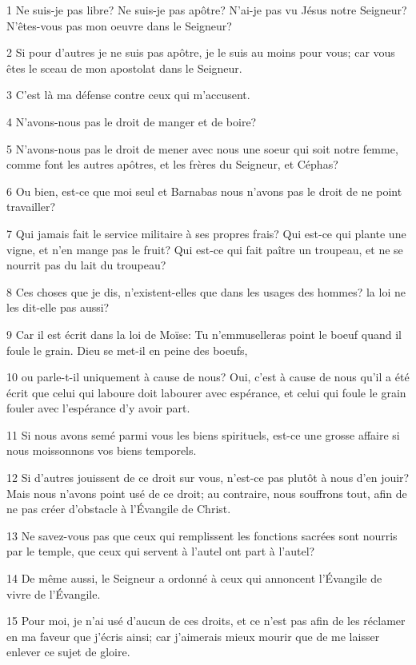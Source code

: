 \par 1 Ne suis-je pas libre? Ne suis-je pas apôtre? N'ai-je pas vu Jésus notre Seigneur? N'êtes-vous pas mon oeuvre dans le Seigneur?
\par 2 Si pour d'autres je ne suis pas apôtre, je le suis au moins pour vous; car vous êtes le sceau de mon apostolat dans le Seigneur.
\par 3 C'est là ma défense contre ceux qui m'accusent.
\par 4 N'avons-nous pas le droit de manger et de boire?
\par 5 N'avons-nous pas le droit de mener avec nous une soeur qui soit notre femme, comme font les autres apôtres, et les frères du Seigneur, et Céphas?
\par 6 Ou bien, est-ce que moi seul et Barnabas nous n'avons pas le droit de ne point travailler?
\par 7 Qui jamais fait le service militaire à ses propres frais? Qui est-ce qui plante une vigne, et n'en mange pas le fruit? Qui est-ce qui fait paître un troupeau, et ne se nourrit pas du lait du troupeau?
\par 8 Ces choses que je dis, n'existent-elles que dans les usages des hommes? la loi ne les dit-elle pas aussi?
\par 9 Car il est écrit dans la loi de Moïse: Tu n'emmuselleras point le boeuf quand il foule le grain. Dieu se met-il en peine des boeufs,
\par 10 ou parle-t-il uniquement à cause de nous? Oui, c'est à cause de nous qu'il a été écrit que celui qui laboure doit labourer avec espérance, et celui qui foule le grain fouler avec l'espérance d'y avoir part.
\par 11 Si nous avons semé parmi vous les biens spirituels, est-ce une grosse affaire si nous moissonnons vos biens temporels.
\par 12 Si d'autres jouissent de ce droit sur vous, n'est-ce pas plutôt à nous d'en jouir? Mais nous n'avons point usé de ce droit; au contraire, nous souffrons tout, afin de ne pas créer d'obstacle à l'Évangile de Christ.
\par 13 Ne savez-vous pas que ceux qui remplissent les fonctions sacrées sont nourris par le temple, que ceux qui servent à l'autel ont part à l'autel?
\par 14 De même aussi, le Seigneur a ordonné à ceux qui annoncent l'Évangile de vivre de l'Évangile.
\par 15 Pour moi, je n'ai usé d'aucun de ces droits, et ce n'est pas afin de les réclamer en ma faveur que j'écris ainsi; car j'aimerais mieux mourir que de me laisser enlever ce sujet de gloire.

